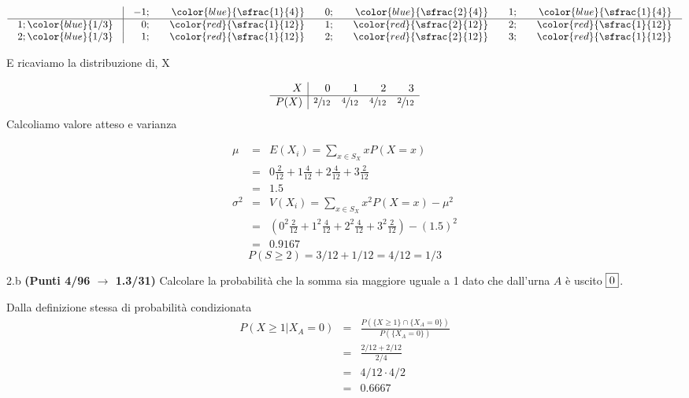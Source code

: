 \documentclass[
  11pt,
]{book}
\theoremstyle{mytheoremstyle}
\theoremstyle{mydefstyle}
\newenvironment{sol}
  {
  \begin{tcolorbox}[enhanced,breakable,arc=0.1mm,boxrule=1pt,colback=white,colframe=iblue,
  title=\bf \fontfamily{lmss}\selectfont \hspace{.5 cm} Soluzione,drop fuzzy shadow]

}{
\end{tcolorbox}
  }
\begin{document}
\begin{sol}

\normalsize

\[\arraycolsep=10pt\def\arraystretch{1}\begin{array}{ r|rrrrrr }
& -1 ;&\color{blue}{ \sfrac{ 1 } { 4 }} & 0 ;&\color{blue}{ \sfrac{ 2 } { 4 }} & 1 ;&\color{blue}{ \sfrac{ 1 } { 4 }} \\ 
\hline 
1 ;\color{blue}{ 1 / 3 }& 0;&\color{red}{\sfrac{1}{12}}& 1;&\color{red}{\sfrac{2}{12}}& 2;&\color{red}{\sfrac{1}{12}}\\ 
2 ;\color{blue}{ 1 / 3 }& 1;&\color{red}{\sfrac{1}{12}}& 2;&\color{red}{\sfrac{2}{12}}& 3;&\color{red}{\sfrac{1}{12}}\\ 
\end{array}
 \]

\normalsize E ricaviamo la distribuzione di, X

\normalsize

\[
     \begin{array}{ r|rrrr }
 X  & 0& 1& 2& 3 \\ 
 \hline 
 P( X ) & \sfrac{2}{12}& \sfrac{4}{12}& \sfrac{4}{12}& \sfrac{2}{12} \\ 
 \end{array}
 \]
\normalsize Calcoliamo valore atteso e varianza

\normalsize

\begin{eqnarray*} \mu &=& E(X_i) = \sum_{x\in S_X}x P(X=x)\\ 
 &=&  0  \frac { 2 }{ 12 }+ 1  \frac { 4 }{ 12 }+ 2  \frac { 4 }{ 12 }+ 3  \frac { 2 }{ 12 } \\ 
            &=& 1.5 \\ 
 \sigma^2 &=& V(X_i) = \sum_{x\in S_X}x^2 P(X=x)-\mu^2\\ 
 &=&\left(  0  ^2\frac { 2 }{ 12 }+ 1  ^2\frac { 4 }{ 12 }+ 2  ^2\frac { 4 }{ 12 }+ 3  ^2\frac { 2 }{ 12 } \right)-( 1.5 )^2\\ 
            &=& 0.9167 
\end{eqnarray*}
\normalsize
\[
P(S\ge 2)=3/12+1/12=4/12=1/3
\]

\end{sol}

2.b \textbf{(Punti 4/96 \(\rightarrow\) 1.3/31)} Calcolare la probabilità che la somma sia maggiore uguale a 1 dato che dall'urna \(A\) è uscito \(\fbox{0}\).

\begin{sol}
Dalla definizione stessa di probabilità condizionata
\begin{eqnarray*}
P(X\geq 1|X_A=0)&=&\frac{P(\{X\geq 1\}\cap\{X_A=0\})}{P(\{X_A=0\})}\\
                &=&\frac{2/12+2/12}{2/4}\\
                &=&4/12\cdot4/2\\
                &=&0.6667
\end{eqnarray*}

\end{sol}
\end{document}
